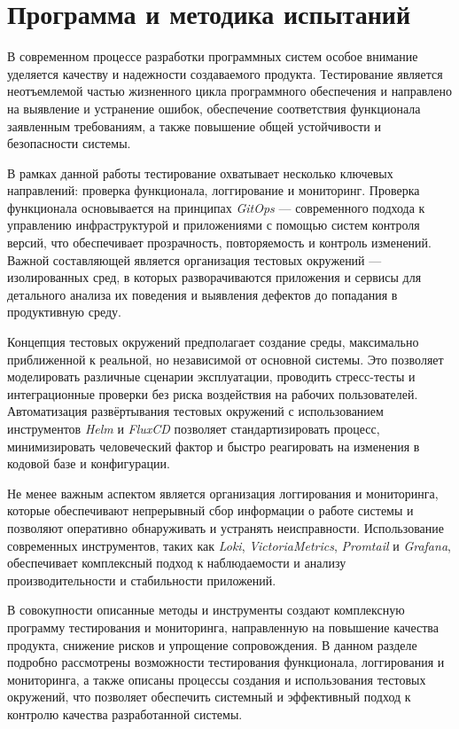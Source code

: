 \section{Программа и методика испытаний}

В современном процессе разработки программных систем особое внимание уделяется качеству и надежности создаваемого продукта. Тестирование является неотъемлемой частью жизненного цикла программного обеспечения и направлено на выявление и устранение ошибок, обеспечение соответствия функционала заявленным требованиям, а также повышение общей устойчивости и безопасности системы. 

В рамках данной работы тестирование охватывает несколько ключевых направлений: проверка функционала, логгирование и мониторинг. Проверка функционала основывается на принципах \textit{GitOps} — современного подхода к управлению инфраструктурой и приложениями с помощью систем контроля версий, что обеспечивает прозрачность, повторяемость и контроль изменений. Важной составляющей является организация тестовых окружений — изолированных сред, в которых разворачиваются приложения и сервисы для детального анализа их поведения и выявления дефектов до попадания в продуктивную среду.

Концепция тестовых окружений предполагает создание среды, максимально приближенной к реальной, но независимой от основной системы. Это позволяет моделировать различные сценарии эксплуатации, проводить стресс-тесты и интеграционные проверки без риска воздействия на рабочих пользователей. Автоматизация развёртывания тестовых окружений с использованием инструментов \textit{Helm} и \textit{FluxCD} позволяет стандартизировать процесс, минимизировать человеческий фактор и быстро реагировать на изменения в кодовой базе и конфигурации.

Не менее важным аспектом является организация логгирования и мониторинга, которые обеспечивают непрерывный сбор информации о работе системы и позволяют оперативно обнаруживать и устранять неисправности. Использование современных инструментов, таких как \textit{Loki}, \textit{VictoriaMetrics}, \textit{Promtail} и \textit{Grafana}, обеспечивает комплексный подход к наблюдаемости и анализу производительности и стабильности приложений.

В совокупности описанные методы и инструменты создают комплексную программу тестирования и мониторинга, направленную на повышение качества продукта, снижение рисков и упрощение сопровождения. В данном разделе подробно рассмотрены возможности тестирования функционала, логгирования и мониторинга, а также описаны процессы создания и использования тестовых окружений, что позволяет обеспечить системный и эффективный подход к контролю качества разработанной системы.

